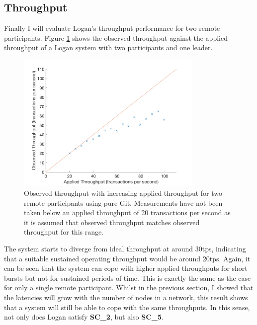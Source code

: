 \documentclass[12pt,a4paper,twoside,openright]{report}
\begin{document}
	\subsection{Throughput}
	Finally I will evaluate Logan's throughput performance for two remote participants.
	Figure \ref{figs:tworemthrthr} shows the observed throughput against the applied throughput of a Logan system with two participants and one leader.
	\begin{figure}
		\centering
		\includegraphics[width=0.8\textwidth]{figs/appliedvsobserved2r.png}
		\caption{Observed throughput with increasing applied throughput for two remote participants using pure Git. Measurements have not been taken below an applied throughput of 20 transactions per second as it is assumed that observed throughput matches observed throughput for this range.}
		\label{figs:tworemthrthr}
	\end{figure}
	The system starts to diverge from ideal throughput at around 30tps, indicating that a suitable sustained operating throughput would be around 20tps.
	Again, it can be seen that the system can cope with higher applied throughputs for short bursts  but not for sustained periods of time. 
	This is exactly the same as the case for only a single remote participant. 
	Whilst in the previous section, I showed that the latencies will grow with the number of nodes in a network, this result shows that a system will still be able to cope with the same throughputs. 
	In this sense, not only does Logan satisfy \textbf{SC\_2}, but also \textbf{SC\_5}.
\end{document}
